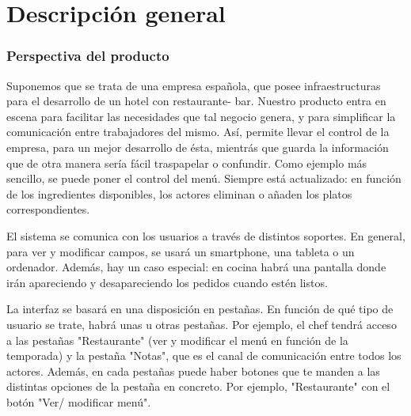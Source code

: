 \documentclass[spanish,a4paper,12pt]{report}	%
\begin{document}
\part{Descripción general}
\section{Perspectiva del producto}

Suponemos que se trata de una empresa española, que posee infraestructuras para el desarrollo de un hotel con restaurante- bar. Nuestro producto entra en escena para facilitar las necesidades que tal negocio genera, y para simplificar la comunicación entre trabajadores del mismo. Así, permite llevar el control de la empresa, para un mejor desarrollo de ésta, mientrás que guarda la información que de otra manera sería fácil traspapelar o confundir. Como ejemplo más sencillo, se puede poner el control del menú. Siempre está actualizado: en función de los ingredientes disponibles, los actores eliminan o añaden los platos correspondientes. 

El sistema se comunica con los usuarios a través de distintos soportes. En general, para ver y modificar campos, se usará un smartphone, una tableta o un ordenador. Además, hay un caso especial: en cocina habrá una pantalla donde irán apareciendo y desapareciendo los pedidos cuando estén listos.

La interfaz se basará en una disposición en pestañas. En función de qué tipo de usuario se trate, habrá unas u otras pestañas. Por ejemplo, el chef tendrá acceso a las pestañas "Restaurante" (ver y modificar el menú en función de la temporada) y la pestaña "Notas", que es el canal de comunicación entre todos los actores. Además, en cada pestañas puede haber botones que te manden a las distintas opciones de la pestaña en concreto. Por ejemplo, "Restaurante" con el botón "Ver/ modificar menú".
\end{document}

